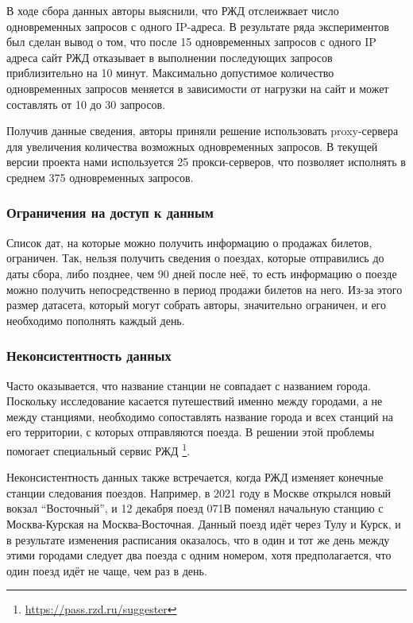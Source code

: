 \documentclass[conference]{IEEEtran}
\begin{document}
В ходе сбора данных авторы выяснили, что РЖД отслеижвает число одновременных запросов с одного IP-адреса. В результате ряда экспериментов был сделан вывод о том, что после 15 одновременных запросов с одного IP адреса сайт РЖД отказывает в выполнении последующих запросов приблизительно на 10 минут. Максимально допустимое количество одновременных запросов меняется в зависимости от нагрузки на сайт и может составлять от 10 до 30 запросов.

Получив данные сведения, авторы приняли решение использовать proxy-сервера для увеличения количества возможных одновременных запросов. В текущей версии проекта нами используется 25 прокси-серверов, что позволяет исполнять в среднем 375 одновременных запросов.

\subsubsection{Ограничения на доступ к данным}
Список дат, на которые можно получить информацию о продажах билетов, ограничен. Так, нельзя получить сведения о поездах, которые отправились до даты сбора, либо позднее, чем 90 дней после неё, то есть информацию о поезде можно получить непосредственно в период продажи билетов на него. Из-за этого размер датасета, который могут собрать авторы, значительно ограничен, и его необходимо пополнять каждый день.


\subsubsection{Неконсистентность данных}
Часто оказывается, что название станции не совпадает с названием города. Поскольку исследование касается путешествий именно между городами, а не между станциями, необходимо сопоставлять название города и всех станций на его территории, с которых отправляются поезда. В решении этой проблемы помогает специальный сервис РЖД \footnote{\href{https://pass.rzd.ru/suggester}{https://pass.rzd.ru/suggester}}. 

Неконсистентность данных также встречается, когда РЖД изменяет конечные станции следования поездов. Например, в 2021 году в Москве открылся новый вокзал ``Восточный'', и 12 декабря поезд 071В поменял начальную станцию с Москва-Курская на Москва-Восточная. Данный поезд идёт через Тулу и Курск, и в результате изменения расписания оказалось, что в один и тот же день между этими городами следует два поезда с одним номером, хотя предполагается, что один поезд идёт не чаще, чем раз в день.
\end{document}
